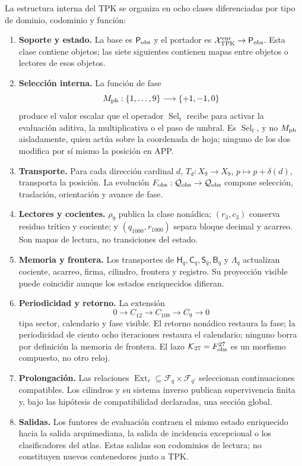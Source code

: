 \begin{definition}
\label{def:categorias-operatorias-tpk-rev11}
La estructura interna del TPK se organiza en ocho clases diferenciadas por tipo de
dominio, codominio y función:
\begin{enumerate}
 \item \textbf{Soporte y estado.} La base es \(\mathsf P_{\rm obs}\) y el
 portador es \(\mathcal X_{\rm TPK}^{\rm enr}\to\mathsf P_{\rm obs}\). Esta
 clase contiene objetos; las siete siguientes contienen mapas entre objetos
 o lectores de esos objetos.
 \item \textbf{Selección interna.} La función de fase
 \[
 M_{\rm ph}:\{1,\ldots,9\}\longrightarrow\{+1,-1,0\}
 \]
 produce el valor escalar que el operador
 \(\operatorname{Sel}_t\) recibe para activar la evaluación aditiva, la
 multiplicativa o el paso de umbral. Es \(\operatorname{Sel}_t\), y no
 \(M_{\rm ph}\) aisladamente, quien actúa sobre la coordenada de hoja; ninguno
 de los dos modifica por sí mismo la posición en APP.
 \item \textbf{Transporte.} Para cada dirección cardinal \(d\),
 \(T_d:X_9\to X_9\), \(p\mapsto p+\delta(d)\), transporta la posición. La
 evolución \(F_{\rm obs}:\mathcal Q_{\rm obs}\to\mathcal Q_{\rm obs}\)
 compone selección, traslación, orientación y avance de fase.
 \item \textbf{Lectores y cocientes.} \(\rho_9\) publica la clase nonádica;
 \((r_3,c_3)\) conserva residuo trítico y cociente; y
 \((q_{1000},r_{1000})\) separa bloque decimal y acarreo. Son mapas de
 lectura, no transiciones del estado.
 \item \textbf{Memoria y frontera.} Los transportes de
 \(\mathsf H_q,\mathsf C_q,\mathsf S_q,\mathsf B_q\) y
 \(\mathsf\Lambda_q\) actualizan cociente, acarreo, firma, cilindro, frontera
 y registro. Su proyección visible puede coincidir aunque los estados
 enriquecidos difieran.
 \item \textbf{Periodicidad y retorno.} La extensión
 \[
 0\longrightarrow C_{12}\longrightarrow C_{108}
 \longrightarrow C_9\longrightarrow0
 \]
 tipa sector, calendario y fase visible. El retorno nonádico restaura la
 fase; la periodicidad de ciento ocho iteraciones restaura el calendario;
 ninguno borra
 por definición la memoria de frontera. El lazo
 \(\mathcal K_{27}=F_{\rm obs}^{27}\) es un morfismo compuesto, no otro
 reloj.
 \item \textbf{Prolongación.} Las relaciones
 \(\operatorname{Ext}_r\subseteq\mathcal F_q\times\mathcal F_{q'}\)
 seleccionan continuaciones compatibles. Los cilindros y su sistema inverso
 publican supervivencia finita y, bajo las hipótesis de compatibilidad
 declaradas, una sección global.
 \item \textbf{Salidas.} Los funtores de evaluación contraen el mismo estado
 enriquecido hacia la salida arquimediana, la salida de incidencia
 excepcional o los clasificadores del atlas. Estas salidas son codominios de
 lectura; no constituyen nuevos contenedores junto a TPK.
\end{enumerate}
\end{definition}

